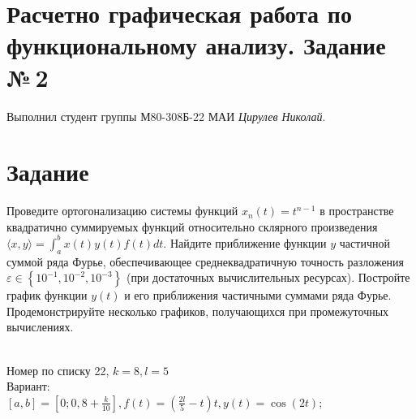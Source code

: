 \documentclass{article}
\begin{document}
\section*{Расчетно графическая работа по функциональному анализу. Задание №\,2}

Выполнил студент группы М80-308Б-22 МАИ \textit{Цирулев Николай}.

\section{Задание}
Проведите ортогонализацию системы функций $x_n(t)=t^{n-1}$ в пространстве квадратично суммируемых функций относительно склярного произведения $\langle x, y\rangle=\int_a^b x(t) y(t) f(t) d t$. Найдите приближение функции $y$ частичной суммой ряда Фурье, обеспечивающее среднеквадратичную точность разложения $\varepsilon \in\left\{10^{-1}, 10^{-2}, 10^{-3}\right\}$ (при достаточных вычислительных ресурсах). Постройте график функции $y(t)$ и его приближения частичными суммами ряда Фурье. Продемонстрируйте несколько графиков, получающихся при промежуточных вычислениях.

\\
Номер по списку 22, $k = 8, l = 5$\\
Вариант: \\
$[a, b]=\left[0 ; 0,8+\frac{k}{10}\right], f(t)=\left(\frac{2 l}{5}-t\right) t, y(t)=\cos (2 t)$;
\end{document}
